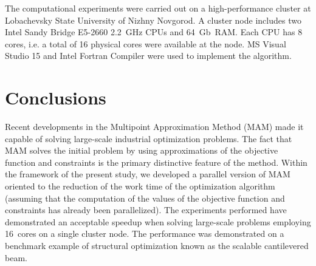\documentclass[a4paper]{llncs}
\begin{document}
The computational experiments were carried out on a high-performance cluster at
Lobachevsky State University of Nizhny Novgorod. A cluster node includes two
Intel Sandy Bridge E5-2660 2.2~GHz CPUs and 64~Gb~RAM. Each CPU has 8 cores,
i.e. a total of 16 physical cores were available at the node. MS Visual Studio
15 and Intel Fortran Compiler were used to implement the algorithm.

\section{Conclusions}

Recent developments in the Multipoint Approximation Method (MAM) made it
capable of solving large-scale industrial optimization problems. The fact that
MAM solves the initial problem by using approximations of the objective
function and constraints is the primary distinctive feature of the method.
Within the framework of the present study, we developed a parallel version of
MAM oriented to the reduction of the work time of the optimization algorithm
(assuming that the computation of the values of the objective function and
constraints has already been parallelized). The experiments performed have
demonstrated an acceptable speedup when solving large-scale problems employing
16~cores on a single cluster node. The performance was demonstrated on a
benchmark example of structural optimization known as the scalable cantilevered
beam.
\end{document}
